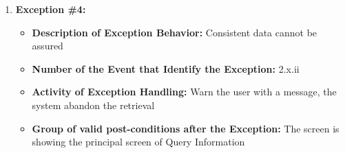 \documentclass[11pt,twoside]{article}
\begin{document}
\begin{enumerate}
\begin{itemize}
 \end{itemize}
 \item \textbf{Exception \#4:}
 \begin{itemize}
  \item \textbf{Description of Exception Behavior:} Consistent data cannot be assured
  \item \textbf{Number of the Event that Identify the Exception:} 2.x.ii
  \item \textbf{Activity of Exception Handling:} Warn the user with a message, the system abandon the retrieval
  \item \textbf{Group of valid post-conditions after the Exception:} The screen is showing the principal screen of Query Information
 \end{itemize}
\end{enumerate}
\end{document}

